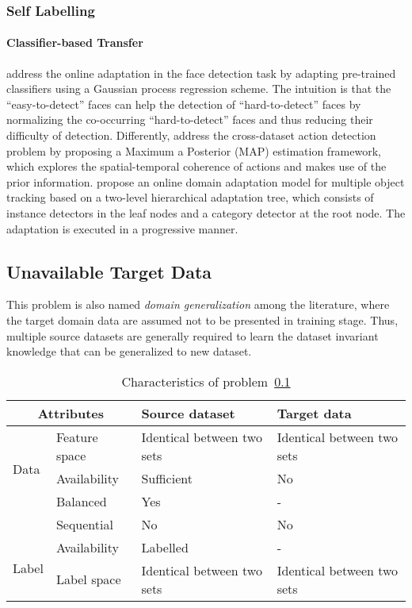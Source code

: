\documentclass[prodmode]{acmsmall}  %
\begin{document}
\subsubsection{Self Labelling}
\paragraph{Classifier-based Transfer}  address the online adaptation in the face detection task by adapting pre-trained classifiers using a Gaussian process regression scheme. The intuition is that the ``easy-to-detect'' faces can help the detection of ``hard-to-detect'' faces by normalizing the co-occurring ``hard-to-detect'' faces and thus reducing their difficulty of detection. 
Differently,  address the cross-dataset action detection problem by proposing a Maximum a Posterior (MAP) estimation framework, which explores the spatial-temporal coherence of actions and makes use of the prior information.  propose an online domain adaptation model for multiple object tracking based on a two-level hierarchical adaptation tree, which consists of instance detectors in the leaf nodes and a category detector at the root node. The adaptation is executed in a progressive manner.

\subsection{Unavailable Target Data}
\label{sec:HOMOgene}
This problem is also named \textit{domain generalization} among the literature, where the target domain data are assumed not to be presented in training stage. Thus, multiple source datasets are generally required to learn the dataset invariant knowledge that can be generalized to new dataset.
\begin{table}[htbp!]
\caption{Characteristics of problem~\ref{sec:HOMOgene}}
\label{tab:HOMOgene}
\begin{center}
\begin{small}
\begin{tabular}{|p{1cm}<{\centering}|m{2.5cm}<{\centering}|m{4.3cm}<{\centering}|m{4.3cm}<{\centering}|}
\hline
\multicolumn{2}{|c|}{Attributes} & Source dataset & Target data \\
\hline \hline
\multirow{3}{*}{Data} & Feature space & Identical between two sets & Identical between two sets\\ 
\cline{2-4}{} & Availability & Sufficient & {\color{red} No}  \\
\cline{2-4}{} & Balanced & Yes & -\\
\cline{2-4}{} & Sequential & No & No\\
\hline \hline
\multirow{2}{*}{Label} & Availability & Labelled & - \\
\cline{2-4}{}  & Label space & Identical between two sets & Identical between two sets\\ 
\hline
\end{tabular}
\end{small}
\end{center}
\end{table}
\end{document}
